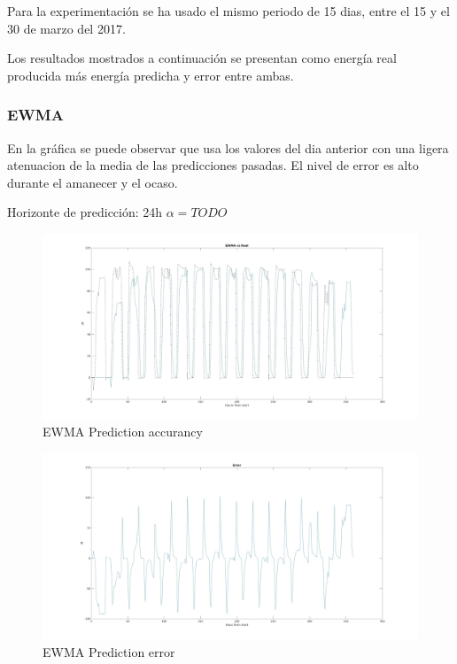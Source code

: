 Para la experimentación se ha usado el mismo periodo de 15 dias, entre el 15 y el 30 de marzo del 2017.

Los resultados mostrados a continuación se presentan como energía real producida más energía predicha y error entre ambas.


\subsubsection{EWMA}
\label{ssub:ewma}

En la gráfica se puede observar que usa los valores del dia anterior con una ligera atenuacion de la media de las predicciones pasadas. El nivel de error es alto durante el amanecer y el ocaso.

Horizonte de predicción: 24h
$\alpha = TODO$

\begin{figure}[h]
    \includegraphics[width=\textwidth]{EWMA.jpg}
    \caption{EWMA Prediction accurancy}
    \label{fig:ewma_comp}
\end{figure}

\begin{figure}[h]
    \includegraphics[width=\textwidth]{EWMA_error.jpg}
    \caption{EWMA Prediction error}
    \label{fig:ewma_error}
\end{figure}


